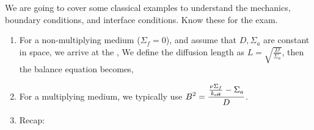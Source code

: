 \documentclass{school-22.211-notes}
\date{March 21, 2012}
\begin{document}
\maketitle

 \label{1g-source}
We are going to cover some classical examples to understand the mechanics, boundary conditions, and interface conditions. Know these for the exam. 

\begin{enumerate}
\item For a non-multiplying medium ($\Sigma_f = 0$), and assume that $D, \Sigma_a$ are constant in space, we arrive at the , 
We define the diffusion length as $\displaystyle L = \sqrt{\frac{D}{\Sigma_a}}$, then the balance equation becomes, 

\item For a multiplying medium, we typically use $\displaystyle B^2 = \frac{\frac{\nu \Sigma_f}{\left. k_{\mathrm{eff}} \right.} - \Sigma_a}{D}$. 

\item Recap:
\end{enumerate}
\end{document}
